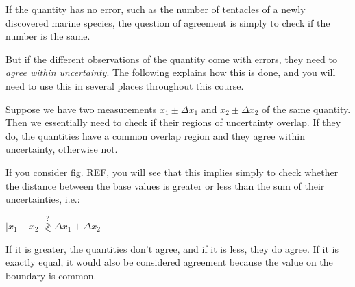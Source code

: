 If the quantity has no error, such as the number of tentacles of a newly discovered marine species, the question of agreement is simply to check if the number is the same.

But if the different observations of the quantity come with errors, they need to {\it agree within uncertainty}. The following explains how this is done, and you will need to use this in several places throughout this course.

Suppose we have two measurements $x_1 \pm \Delta x_1$ and $x_2 \pm \Delta x_2$ of the same quantity. Then we essentially need to check if their regions of uncertainty overlap. If they do, the quantities have a common overlap region and they agree within uncertainty, otherwise not.

If you consider fig. REF, you will see that this implies simply to check whether the distance between the base values is greater or less than the sum of their uncertainties, i.e.:

\begin{center}
$\left|x_1-x_2\right| \stackrel{?}{\gtrless} \Delta x_1 + \Delta x_2$
\end{center}

If it is greater, the quantities don't agree, and if it is less, they do agree. If it is exactly equal, it would also be considered agreement because the value on the boundary is common.

